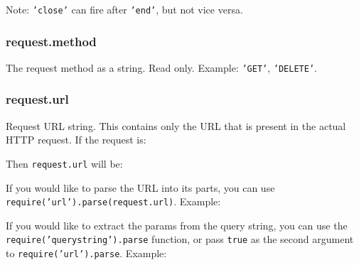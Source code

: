 Note: \texttt{'close'} can fire after \texttt{'end'}, but not vice
versa.

\subsubsection{request.method}

The request method as a string. Read only. Example: \texttt{'GET'},
\texttt{'DELETE'}.

\subsubsection{request.url}

Request URL string. This contains only the URL that is present in the
actual HTTP request. If the request is:

\begin{Shaded}
\begin{Highlighting}[]
\end{Highlighting}
\end{Shaded}

Then \texttt{request.url} will be:

\begin{Shaded}
\begin{Highlighting}[]
\end{Highlighting}
\end{Shaded}

If you would like to parse the URL into its parts, you can use
\texttt{require('url').parse(request.url)}. Example:

\begin{Shaded}
\begin{Highlighting}[]
\NormalTok{(}\NormalTok{)}
\NormalTok{\{ }\NormalTok{: }\NormalTok{,}
  \NormalTok{: }\NormalTok{,}
  \NormalTok{: }\NormalTok{,}
  \NormalTok{: } \NormalTok{\}}
\end{Highlighting}
\end{Shaded}

If you would like to extract the params from the query string, you can
use the \texttt{require('querystring').parse} function, or pass
\texttt{true} as the second argument to \texttt{require('url').parse}.
Example:

